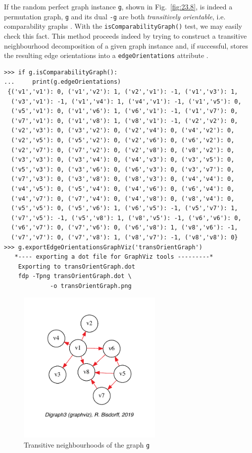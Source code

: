 If the random perfect graph instance \texttt{g}, shown in Fig.~\vref{fig:23.8}, is indeed a permutation graph, \texttt{g} and its dual \texttt{-g} are both \emph{transitively orientable}, i.e. comparability graphs \citep{GOL-2004}. With the \texttt{isComparabilityGraph()} test, we may easily check this fact. This method proceeds indeed by trying to construct a transitive neighbourhood decomposition of a given graph instance and, if successful, stores the resulting edge orientations into a \texttt{edgeOrientations} attribute \citep[p.129-132]{GOL-2004}.
\begin{lstlisting}[basicstyle=\scriptsize]
>>> if g.isComparabilityGraph():
...     print(g.edgeOrientations)  
 {('v1','v1'): 0, ('v1','v2'): 1, ('v2','v1'): -1, ('v1','v3'): 1,
  ('v3','v1'): -1, ('v1','v4'): 1, ('v4','v1'): -1, ('v1','v5'): 0,
  ('v5','v1'): 0, ('v1','v6'): 1, ('v6','v1'): -1, ('v1','v7'): 0,
  ('v7','v1'): 0, ('v1','v8'): 1, ('v8','v1'): -1, ('v2','v2'): 0,
  ('v2','v3'): 0, ('v3','v2'): 0, ('v2','v4'): 0, ('v4','v2'): 0,
  ('v2','v5'): 0, ('v5','v2'): 0, ('v2','v6'): 0, ('v6','v2'): 0,
  ('v2','v7'): 0, ('v7','v2'): 0, ('v2','v8'): 0, ('v8','v2'): 0,
  ('v3','v3'): 0, ('v3','v4'): 0, ('v4','v3'): 0, ('v3','v5'): 0,
  ('v5','v3'): 0, ('v3','v6'): 0, ('v6','v3'): 0, ('v3','v7'): 0,
  ('v7','v3'): 0, ('v3','v8'): 0, ('v8','v3'): 0, ('v4','v4'): 0,
  ('v4','v5'): 0, ('v5','v4'): 0, ('v4','v6'): 0, ('v6','v4'): 0,
  ('v4','v7'): 0, ('v7','v4'): 0, ('v4','v8'): 0, ('v8','v4'): 0,
  ('v5','v5'): 0, ('v5','v6'): 1, ('v6','v5'): -1, ('v5','v7'): 1,
  ('v7','v5'): -1, ('v5','v8'): 1, ('v8','v5'): -1, ('v6','v6'): 0,
  ('v6','v7'): 0, ('v7','v6'): 0, ('v6','v8'): 1, ('v8','v6'): -1,
  ('v7','v7'): 0, ('v7','v8'): 1, ('v8','v7'): -1, ('v8','v8'): 0}
>>> g.exportEdgeOrientationsGraphViz('transOrientGraph')
   *---- exporting a dot file for GraphViz tools ---------*
    Exporting to transOrientGraph.dot
    fdp -Tpng transOrientGraph.dot \
             -o transOrientGraph.png
\end{lstlisting}		    
\begin{figure}[h]
\sidecaption[t]
\includegraphics[width=7cm]{Figures/23-9-transOrientGraph.pdf}
\caption{Transitive neighbourhoods of the graph \texttt{g}} 
\label{fig:23.9}       %
\end{figure}

